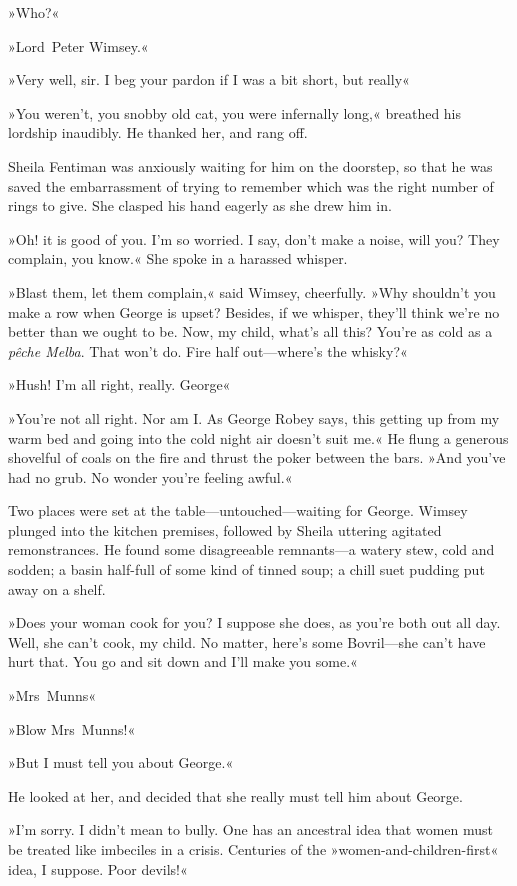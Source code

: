 »Who?«

»Lord~Peter Wimsey.«

»Very well, sir. I beg your pardon if I was a bit short, but really\longdash«

»You weren't, you snobby old cat, you were infernally long,« breathed his lordship inaudibly. He thanked her, and rang off.

Sheila Fentiman was anxiously waiting for him on the doorstep, so that he was saved the embarrassment of trying to remember which was the right number of rings to give. She clasped his hand eagerly as she drew him in.

»Oh! it is good of you. I'm so worried. I say, don't make a noise, will you? They complain, you know.« She spoke in a harassed whisper.

»Blast them, let them complain,« said Wimsey, cheerfully. »Why shouldn't you make a row when George is upset? Besides, if we whisper, they'll think we're no better than we ought to be. Now, my child, what's all this? You're as cold as a \textit{pêche Melba}. That won't do. Fire half out—where's the whisky?«

»Hush! I'm all right, really. George\longdash«

»You're not all right. Nor am I\@. As George Robey says, this getting up from my warm bed and going into the cold night air doesn't suit me.« He flung a generous shovelful of coals on the fire and thrust the poker between the bars. »And you've had no grub. No wonder you're feeling awful.«

Two places were set at the table—untouched—waiting for George. Wimsey plunged into the kitchen premises, followed by Sheila uttering agitated remonstrances. He found some disagreeable remnants—a watery stew, cold and sodden; a basin half-full of some kind of tinned soup; a chill suet pudding put away on a shelf.

»Does your woman cook for you? I suppose she does, as you're both out all day. Well, she can't cook, my child. No matter, here's some Bovril—she can't have hurt that. You go and sit down and I'll make you some.«

»Mrs~Munns\longdash«

»Blow Mrs~Munns!«

»But I must tell you about George.«

He looked at her, and decided that she really must tell him about George.

»I'm sorry. I didn't mean to bully. One has an ancestral idea that women must be treated like imbeciles in a crisis. Centuries of the »women-and-children-first« idea, I suppose. Poor devils!«

